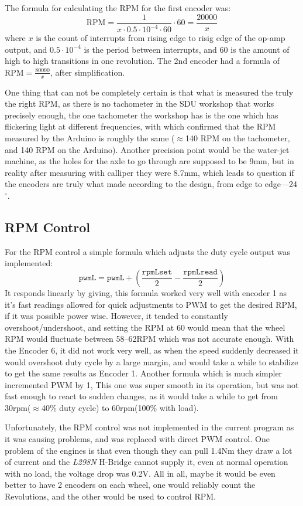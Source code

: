 \documentclass[11pt]{article}
\begin{document}
The formula for calculating the RPM for the first encoder was:
$$\text{RPM}=\frac{1}{x\cdot0.5\cdot10^{-4}\cdot60}\cdot60=\frac{20000}{x}$$
where $x$ is the count of interrupts from rising edge to risig edge of the op-amp output, and $0.5\cdot10^{-4}$ is the period between interrupts, and $60$ is the amount of high to high transitions in one revolution. The 2nd encoder had a formula of $\text{RPM}=\frac{80000}{x}$, after simplification.


One thing that can not be completely certain is that what is measured the truly the right RPM, as there is no tachometer in the SDU workshop that works precisely enough, the one tachometer the workshop has is the one which has flickering light at different frequencies, with which confirmed that the RPM measured by the Arduino is roughly the same ($\approx$140 RPM on the tachometer, and 140 RPM on the Arduino). Another precision point would be the water-jet machine, as the holes for the axle to go through are supposed to be 9mm, but in reality after measuring with calliper they were 8.7mm, which leads to question if the encoders are truly what made according to the design, from edge to edge---24$^\circ$.

\subsection*{RPM Control}
For the RPM control a simple formula which adjusts the duty cycle output was implemented:
$$\texttt{pwmL}=\texttt{pwmL}+(\frac{\texttt{rpmLset}}{2}-\frac{\texttt{rpmLread}}{2})$$
It responds linearly by giving, this formula worked very well with encoder 1 as it's fast readings allowed for quick adjustments to PWM to get the desired RPM, if it was possible power wise. However, it tended to constantly overshoot/undershoot, and setting the RPM at 60 would mean that the wheel RPM would fluctuate between 58--62RPM which was not accurate enough. With the Encoder 6, it did not work very well, as when the speed suddenly decreased it would overshoot duty cycle by a large margin, and would take a while to stabilize to get the same results as Encoder 1.
Another formula which is much simpler incremented PWM by 1, This one was super smooth in its operation, but was not fast enough to react to sudden changes, as it would take a while to get from 30rpm($\approx$40\% duty cycle) to 60rpm(100\% with load).


Unfortunately, the RPM control was not implemented in the current program as it was causing problems, and was replaced with direct PWM control. One problem of the engines is that even though they can pull 1.4Nm they draw a lot of current and the \textit{L298N} H-Bridge cannot supply it, even at normal operation with no load, the voltage drop was 0.2V. All in all, maybe it would be even better to have 2 encoders on each wheel, one would reliably count the Revolutions, and the other would be used to control RPM.
\newpage
\end{document}
